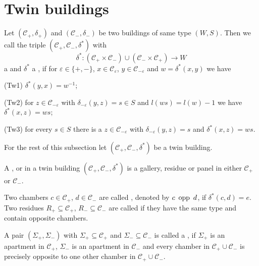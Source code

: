 \section{Twin buildings}

\begin{defi}
	Let $(\mathcal{C}_+, \delta_+)$ and $(\mathcal{C}_-, \delta_-)$ be two buildings of same type $(W,S)$. Then we call the triple $(\mathcal{C}_+,\mathcal{C}_-,\delta^*)$ with
	$$ \delta^* : (\mathcal{C}_+ \times \mathcal{C}_-) \cup (\mathcal{C}_- \times \mathcal{C}_+) \to W $$
	a  and $\delta^*$ a , if for $\varepsilon \in \{+,-\}$, $x \in \mathcal{C}_\varepsilon$, $y \in \mathcal{C}_{-\varepsilon}$ and $w = \delta^*(x,y)$ we have
	\begin{axioms}
		\item[(Tw1)] $\delta^*(y,x) = w^{-1}$;
		\item[(Tw2)] for $z \in \mathcal{C}_{-\varepsilon}$ with $\delta_{-\varepsilon}(y,z) = s \in S$ and $l(ws) = l(w) - 1$ we have $\delta^*(x,z) = ws$;
		\item[(Tw3)] for every $s \in S$ there is a $z \in \mathcal{C}_{-\varepsilon}$ with $\delta_{-\varepsilon}(y,z) = s$ and $\delta^*(x,z) = ws$.
	\end{axioms}
\end{defi}

	For the rest of this subsection let $(\mathcal{C}_+,\mathcal{C}_-,\delta^*)$ be a twin building.

\begin{defi}
	A ,  or  in a twin building $(\mathcal{C}_+,\mathcal{C}_-,\delta^*)$ is a gallery, residue or panel in either $\mathcal{C}_+$ or $\mathcal{C}_-$.
\end{defi}

\begin{defi}
	Two chambers $c \in \mathcal{C}_+$, $d \in \mathcal{C}_-$ are called , denoted by $c \opp d$, if $\delta^*(c,d) = e$. Two residues $R_+ \subseteq \mathcal{C}_+$, $R_- \subseteq \mathcal{C}_-$ are called  if they have the same type and contain opposite chambers.
\end{defi}

\begin{defi}
	A pair $(\Sigma_+,\Sigma_-)$ with $\Sigma_+ \subseteq \mathcal{C}_+$ and $\Sigma_- \subseteq \mathcal{C}_-$ is called a , if $\Sigma_+$ is an apartment in $\mathcal{C}_+$, $\Sigma_-$ is an apartment in $\mathcal{C}_-$ and every chamber in $\mathcal C_+ \cup \mathcal C_-$ is precisely opposite to one other chamber in $\mathcal C_+ \cup \mathcal C_-$.
\end{defi}

